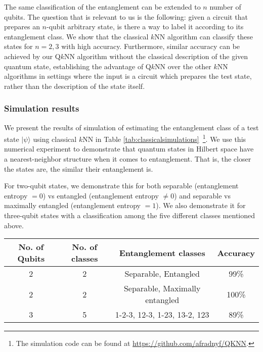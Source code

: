 \documentclass[a4paper,twocolumn,11pt,unpublished]{quantumarticle}
\newcommand{\rang}{\rangle}
\begin{document}
        The same classification of the entanglement can be extended to  $n$ number of qubits. The question that is relevant to us is the following: given a circuit that prepares an $n$-qubit arbitrary state, is there a way to label it according to its entanglement class. We show that the classical $k$NN algorithm can classify these states for $n=2, 3$ with high accuracy. Furthermore, similar accuracy can be achieved by our Q$k$NN algorithm without the classical description of the given quantum state, establishing the advantage of Q$k$NN over the other $k$NN algorithms in settings where the input is a circuit which prepares the test state, rather than the description of the state itself.
        
    \subsubsection{Simulation results}
    
    We present the results of simulation of estimating the entanglement class of a test state $|\psi\rang$ using classical $k$NN in Table \ref{tab:classicalsimulations}~\footnote{The simulation code can be found at \url{https://github.com/afradnyf/QKNN}.}. We use this numerical experiment to demonstrate that quantum states in Hilbert space have a nearest-neighbor structure when it comes to entanglement. That is, the closer the states are, the similar their entanglement is. 
    
    For two-qubit states, we demonstrate this for both separable (entanglement entropy $= 0$) vs entangled (entanglement entropy $\neq 0$) and separable vs maximally entangled (entanglement entropy $= 1$). We also demonstrate it for three-qubit states with a classification among the five different classes mentioned above. 
    
    
    
    \begin{table*}
        \center
        \begin{tabular}{|c|c|c|c|} 
         \hline
         No. of Qubits & No. of classes & Entanglement classes & Accuracy \\ 
         \hline
         2 & 2 & Separable, Entangled & 99\% \\ 
         \hline
         2 & 2 & Separable, Maximally entangled & 100\% \\
         \hline
         3 & 5 & 1-2-3, 12-3, 1-23, 13-2, 123 & 89\%  \\
         \hline
        \end{tabular} 
        \caption{Entanglement classification using classical $k$NN classifier. Cardinality of the set of train states is $M =$ (number of classes)$\times$(class size). In each case, the total number of train states used for each class is $10 ^ 5$.}
        \label{tab:classicalsimulations}
    \end{table*}
    
\end{document}
